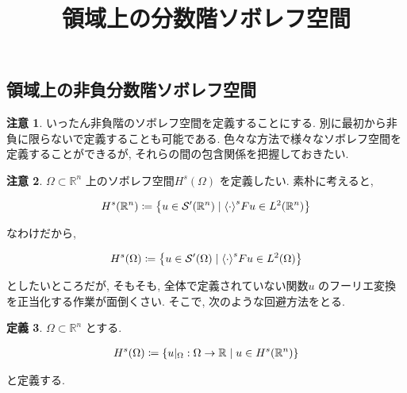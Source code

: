 \documentclass[10pt, fleqn, label-section=none]{bxjsarticle}
\title{領域上の分数階ソボレフ空間}
\date{}
\author{}
\theoremstyle{definition}
\newtheorem{dfn}{定義}[section]
\newtheorem{remark}[dfn]{注意}
\newcommand{\cbra}[1]{\mleft\{#1\mright\}}
\newcommand{\tbra}[1]{\mleft\langle#1\mright\rangle}
\renewcommand{\;}{\, ; \,}
\begin{document}
\maketitle

\section{}

\subsection{領域上の非負分数階ソボレフ空間}

\begin{remark}いったん非負階のソボレフ空間を定義することにする. 別に最初から非負に限らないで定義することも可能である. 
色々な方法で様々なソボレフ空間を定義することができるが, それらの間の包含関係を把握しておきたい. 

\end{remark}


\begin{remark}$\Omega \subset \mathbb R^n$ 上のソボレフ空間$H^s (\Omega)$ を定義したい. 素朴に考えると, 

\begin{align*} H^s(\mathbb R^n) \coloneqq \cbra{u \in \mathcal S^\prime (\mathbb R^n) \mid \tbra{\cdot}^s Fu \in L^2(\mathbb R^n) }\end{align*}

なわけだから, 

\begin{align*} H^s(\Omega ) \coloneqq \cbra{ u \in \mathcal S^\prime (\Omega) \mid \tbra{\cdot}^s Fu \in L^2(\Omega) }\end{align*}

としたいところだが, そもそも, 全体で定義されていない関数$u $ のフーリエ変換を正当化する作業が面倒くさい. そこで, 次のような回避方法をとる. 

\end{remark}

\begin{dfn}$\Omega \subset \mathbb R^n$ とする. 

\begin{align*} H^s(\Omega) \coloneqq \cbra{ u |_\Omega : \Omega \rightarrow \mathbb R \mid u \in H^s(\mathbb R^n)}\end{align*}

と定義する. 

\end{dfn}
\end{document}
